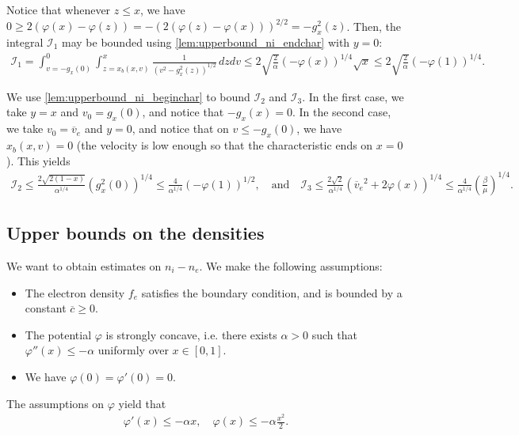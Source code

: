 \documentclass{article}
\numberwithin{equation}{section}
\newcommand{\ve}{{\overline{v}_e}} %
\newcommand{\DomUpL}{{\mathcal{D}_1}} %
\newcommand{\DomUpR}{{\mathcal{D}_2}} %
\newcommand{\DomLow}{{\mathcal{D}_3}} %
\newcommand{\IntUpL}{{\mathcal{I}_1}} %
\newcommand{\IntUpR}{{\mathcal{I}_2}} %
\newcommand{\IntLow}{{\mathcal{I}_3}} %
\newcommand{\maxfe}{{\overline{c}}} %
\begin{document}
{	
	Notice that whenever $z \leqslant x$, we have $0 \geqslant 2\left(\varphi(x) - \varphi(z)\right) = - \left(2\left(\varphi(z) - \varphi(x)\right)\right)^{2/2} = - g_x^2(z)$. Then, the integral $\IntUpL$ may be bounded using \cref{lem:upperbound_ni_endchar} with $y=0$:
	\begin{align*}
		\IntUpL = \int_{v=-g_x(0)}^{0} \int_{z=x_b(x,v)}^{x} \frac{1}{\left(v^2 - g_x^2(z)\right)^{1/2}} \, dz dv 
		\leqslant 2 \sqrt{\frac{2}{\alpha}} \left(-\varphi(x)\right)^{1/4} \sqrt{x}
		\leqslant 2 \sqrt{\frac{2}{\alpha}} \left(-\varphi(1)\right)^{1/4}.
	\end{align*}
	
	We use \cref{lem:upperbound_ni_beginchar} to bound $\IntUpR$ and $\IntLow$. In the first case, we take $y=x$ and $v_0 = g_x(0)$, and notice that $-g_x(x)=0$. In the second case, we take $v_0 = \ve$ and $y=0$, and notice that on $v \leqslant -g_x(0)$, we have $x_b(x,v) = 0$ (the velocity is low enough so that the characteristic ends on $x=0$). This yields
	\begin{align*}
		\IntUpR \leqslant \frac{2\sqrt{2(1-x)}}{\alpha^{1/4}} \left(g_x^2(0)\right)^{1/4} \leqslant \frac{4}{\alpha^{1/4}} \left(-\varphi(1)\right)^{1/2} , \quad\text{and}\quad
		\IntLow \leqslant \frac{2\sqrt{2}}{\alpha^{1/4}} \left(\ve^2 + 2 \varphi(x)\right)^{1/4} \leqslant \frac{4}{\alpha^{1/4}} \left(\frac{\beta}{\mu}\right)^{1/4}.
	\end{align*}
	
	
}








\subsection{Upper bounds on the densities}

We want to obtain estimates on $n_i - n_e$. We make the following assumptions:
\begin{itemize}
\item The electron density $f_e$ satisfies the boundary condition, and is bounded by a constant $\maxfe \geqslant 0$. 
\item The potential $\varphi$ is strongly concave, i.e. there exists $\alpha>0$ such that $\varphi''(x) \leqslant - \alpha$ uniformly over $x\in[0,1]$.
\item We have $\varphi(0) = \varphi'(0) = 0$.
\end{itemize}
The assumptions on $\varphi$ yield that
\begin{align}\label{eq:phi_concave_consequences}
	\varphi'(x) \leqslant- \alpha x, \quad \varphi(x) \leqslant - \alpha \frac{x^2}{2}.
\end{align}
\end{document}
